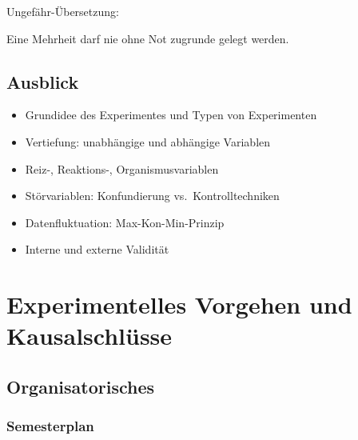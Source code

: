\documentclass[
]{book}
\providecommand{\tightlist}{%
  \setlength{\itemsep}{0pt}\setlength{\parskip}{0pt}}
\begin{document}
Ungefähr-Übersetzung:

Eine Mehrheit darf nie ohne Not zugrunde gelegt werden.

\hypertarget{ausblick}{%
\section{Ausblick}\label{ausblick}}

\begin{itemize}
\tightlist
\item
  Grundidee des Experimentes und Typen von Experimenten
\item
  Vertiefung: unabhängige und abhängige Variablen
\item
  Reiz-, Reaktions-, Organismusvariablen
\item
  Störvariablen: Konfundierung vs.~Kontrolltechniken
\item
  Datenfluktuation: Max-Kon-Min-Prinzip
\item
  Interne und externe Validität
\end{itemize}

\hypertarget{experimentelles-vorgehen-und-kausalschluxfcsse}{%
\chapter{Experimentelles Vorgehen und Kausalschlüsse}\label{experimentelles-vorgehen-und-kausalschluxfcsse}}

\hypertarget{organisatorisches-2}{%
\section{Organisatorisches}\label{organisatorisches-2}}

\hypertarget{semesterplan-3}{%
\subsection{Semesterplan}\label{semesterplan-3}}
\end{document}
